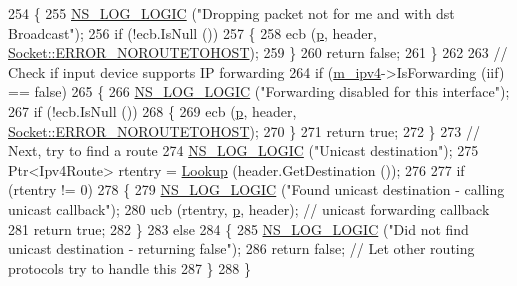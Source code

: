 \begin{DoxyCode}
254     \{
255       \hyperlink{group__logging_ga88acd260151caf2db9c0fc84997f45ce}{NS\_LOG\_LOGIC} (\textcolor{stringliteral}{"Dropping packet not for me and with dst Broadcast"});
256       \textcolor{keywordflow}{if} (!ecb.IsNull ())
257         \{
258           ecb (\hyperlink{lte__link__budget_8m_ac9de518908a968428863f829398a4e62}{p}, header, \hyperlink{classns3_1_1Socket_ada1328c5ae0c28cb2a982caf8f6d6ccaa0f8ecb5a4ddbce3bade35fa12c3d49e8}{Socket::ERROR\_NOROUTETOHOST});
259         \}
260       \textcolor{keywordflow}{return} \textcolor{keyword}{false};
261     \}
262 
263   \textcolor{comment}{// Check if input device supports IP forwarding}
264   \textcolor{keywordflow}{if} (\hyperlink{classns3_1_1Rip_a6e2c0e74d2fa8643d223db26621dd7f1}{m\_ipv4}->IsForwarding (iif) == \textcolor{keyword}{false})
265     \{
266       \hyperlink{group__logging_ga88acd260151caf2db9c0fc84997f45ce}{NS\_LOG\_LOGIC} (\textcolor{stringliteral}{"Forwarding disabled for this interface"});
267       \textcolor{keywordflow}{if} (!ecb.IsNull ())
268         \{
269           ecb (\hyperlink{lte__link__budget_8m_ac9de518908a968428863f829398a4e62}{p}, header, \hyperlink{classns3_1_1Socket_ada1328c5ae0c28cb2a982caf8f6d6ccaa0f8ecb5a4ddbce3bade35fa12c3d49e8}{Socket::ERROR\_NOROUTETOHOST});
270         \}
271       \textcolor{keywordflow}{return} \textcolor{keyword}{true};
272     \}
273   \textcolor{comment}{// Next, try to find a route}
274   \hyperlink{group__logging_ga88acd260151caf2db9c0fc84997f45ce}{NS\_LOG\_LOGIC} (\textcolor{stringliteral}{"Unicast destination"});
275   Ptr<Ipv4Route> rtentry = \hyperlink{classns3_1_1Rip_a50d486fb2eee757bb9f9d528d3828dab}{Lookup} (header.GetDestination ());
276 
277   \textcolor{keywordflow}{if} (rtentry != 0)
278     \{
279       \hyperlink{group__logging_ga88acd260151caf2db9c0fc84997f45ce}{NS\_LOG\_LOGIC} (\textcolor{stringliteral}{"Found unicast destination - calling unicast callback"});
280       ucb (rtentry, \hyperlink{lte__link__budget_8m_ac9de518908a968428863f829398a4e62}{p}, header);  \textcolor{comment}{// unicast forwarding callback}
281       \textcolor{keywordflow}{return} \textcolor{keyword}{true};
282     \}
283   \textcolor{keywordflow}{else}
284     \{
285       \hyperlink{group__logging_ga88acd260151caf2db9c0fc84997f45ce}{NS\_LOG\_LOGIC} (\textcolor{stringliteral}{"Did not find unicast destination - returning false"});
286       \textcolor{keywordflow}{return} \textcolor{keyword}{false}; \textcolor{comment}{// Let other routing protocols try to handle this}
287     \}
288 \}
\end{DoxyCode}


